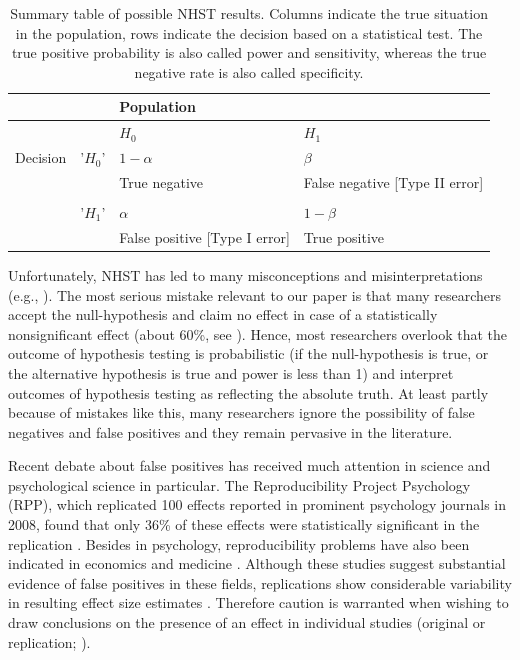 \documentclass{article}
\begin{document}
\begin{table}[htbp]
\caption{Summary table of possible NHST results. Columns indicate the true situation in the population, rows indicate the decision based on a statistical test. The true positive probability is also called power and sensitivity, whereas the true negative rate is also called specificity.}
\begin{adjustbox}{width=\textwidth,totalheight=\textheight,keepaspectratio,angle=0}
\centering
\begin{tabular}{llll}
&    & Population                        &                                    \\ \hline
&    & $H_0$                                & $H_1$                                 \\
Decision & '$H_0$' & $1-\alpha$                           & $\beta$                               \\
&    & True negative                     & False negative {[}Type II error{]} \\
& & & \\
& '$H_1$' & $\alpha$                             & $1-\beta$                             \\
&    & False positive {[}Type I error{]} & True positive                   \\  \hline
\end{tabular}
\end{adjustbox}
\label{tab:tab1}
\end{table}

Unfortunately, NHST has led to many misconceptions and misinterpretations (e.g., \cite{Goodman2008135,Bakan_1966}). The most serious mistake relevant to our paper is that many researchers accept the null-hypothesis and claim no effect in case of a statistically nonsignificant effect (about 60\%, see \cite{Hoekstra2006}). Hence, most researchers overlook that the outcome of hypothesis testing is probabilistic (if the null-hypothesis is true, or the alternative hypothesis is true and power is less than 1) and interpret outcomes of hypothesis testing as reflecting the absolute truth. At least partly because of mistakes like this, many researchers ignore the possibility of false negatives and false positives and they remain pervasive in the literature.

Recent debate about false positives has received much attention in science and psychological science in particular. The Reproducibility Project Psychology (RPP), which replicated 100 effects reported in prominent psychology journals in 2008, found that only 36\% of these effects were statistically significant in the replication \cite{Open_Science_Collaboration2015-zs}. Besides in psychology, reproducibility problems have also been indicated in economics \cite{Camerer2016-zz} and medicine \cite{Begley2012-uc}. Although these studies suggest substantial evidence of false positives in these fields, replications show considerable variability in resulting effect size estimates \cite{Klein2014-jb, Stanley2014-pd}. Therefore caution is warranted when wishing to draw conclusions on the presence of an effect in individual studies (original or replication; \cite{Open_Science_Collaboration2015-zs,Gilbert2016-mi,Anderson2016-bv}).
\end{document}
